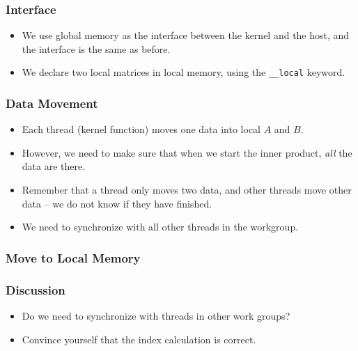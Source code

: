 \documentclass{beamer}
\begin{document}
\begin{frame}
\end{frame}

\begin{frame}
  \frametitle{Interface}
  \begin{itemize}
    \item We use global memory as the interface between the kernel and
      the host, and the interface is the same as before.
    \item We declare two local matrices in local memory, using the
      {\tt \_\_local} keyword.
  \end{itemize}
\end{frame}

\begin{frame}
\end{frame}

\begin{frame}
  \frametitle{Data Movement}
  \begin{itemize}
    \item Each thread (kernel function) moves one data into local $A$
      and $B$.
    \item However, we need to make sure that when we start the inner
      product, {\em all} the data are there.
    \item Remember that a thread only moves two data, and other threads move other data -- we do not know if they have finished.
    \item We need to synchronize with all other threads in the workgroup.
  \end{itemize}
\end{frame}

\begin{frame}
\end{frame}

\begin{frame}
  \frametitle{Move to Local Memory}
  \centerline{}
\end{frame}


\begin{frame}
  \frametitle{Discussion}
  \begin{itemize}
    \item Do we need to synchronize with threads in other work groups?
    \item Convince yourself that the index calculation is correct.
  \end{itemize}
\end{frame}
\end{document}
